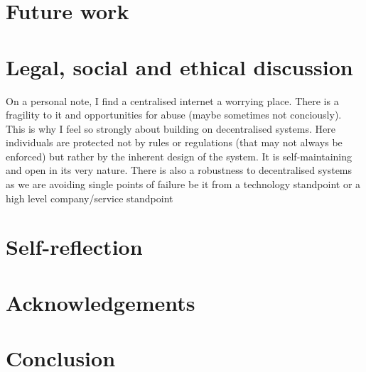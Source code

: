 \documentclass[a4paper]{article}
\begin{document}
\section{Future work}
\section{Legal, social and ethical discussion}
On a personal note, I find a centralised internet a worrying place. There is a fragility to it and opportunities for abuse (maybe sometimes not conciously). This is why I feel so strongly about building on decentralised systems. Here individuals are protected not by rules or regulations (that may not always be enforced) but rather by the inherent design of the system. It is self-maintaining and open in its very nature. There is also a robustness to decentralised systems as we are avoiding single points of failure be it from a technology standpoint or a high level company/service standpoint
\section{Self-reflection}
\section{Acknowledgements}
\section{Conclusion}
\end{document}
